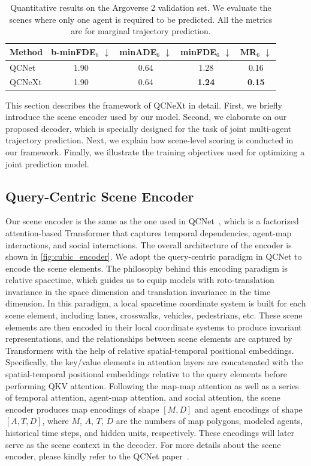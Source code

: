 \documentclass[10pt,twocolumn,letterpaper]{article}
\begin{document}
\begin{table}[t]
\footnotesize
\centering
\setlength{\tabcolsep}{2.2mm}
\begin{tabular}{lcccc}
\toprule
Method & b-minFDE${}_6$ $\downarrow$ & minADE${}_6$ $\downarrow$ & minFDE${}_6$ $\downarrow$ & MR${}_6$ $\downarrow$ \\
\midrule
QCNet & 1.90 & 0.64 & 1.28 & 0.16 \\
QCNeXt & 1.90 & 0.64 & \textbf{1.24} & \textbf{0.15} \\
\bottomrule
\end{tabular}
\caption{Quantitative results on the Argoverse 2 validation set. We evaluate the scenes where only one agent is required to be predicted. All the metrics are for marginal trajectory prediction.}
\label{tab:av2_joint_val}
\end{table}

This section describes the framework of QCNeXt in detail. First, we briefly introduce the scene encoder used by our model. Second, we elaborate on our proposed decoder, which is specially designed for the task of joint multi-agent trajectory prediction. Next, we explain how scene-level scoring is conducted in our framework. Finally, we illustrate the training objectives used for optimizing a joint prediction model.

\subsection{Query-Centric Scene Encoder}

Our scene encoder is the same as the one used in QCNet~\cite{zhou2023query}, which is a factorized attention-based Transformer that captures temporal dependencies, agent-map interactions, and social interactions. The overall architecture of the encoder is shown in \cref{fig:cubic_encoder}. We adopt the query-centric paradigm in QCNet to encode the scene elements. The philosophy behind this encoding paradigm is relative spacetime, which guides us to equip models with roto-translation invariance in the space dimension and translation invariance in the time dimension. In this paradigm, a local spacetime coordinate system is built for each scene element, including lanes, crosswalks, vehicles, pedestrians, etc. These scene elements are then encoded in their local coordinate systems to produce invariant representations, and the relationships between scene elements are captured by Transformers with the help of relative spatial-temporal positional embeddings. Specifically, the key/value elements in attention layers are concatenated with the spatial-temporal positional embeddings relative to the query elements before performing QKV attention. Following the map-map attention as well as a series of temporal attention, agent-map attention, and social attention, the scene encoder produces map encodings of shape $[M, D]$ and agent encodings of shape $[A, T, D]$, where $M$, $A$, $T$, $D$ are the numbers of map polygons, modeled agents, historical time steps, and hidden units, respectively. These encodings will later serve as the scene context in the decoder. For more details about the scene encoder, please kindly refer to the QCNet paper~\cite{zhou2023query}.
\end{document}

